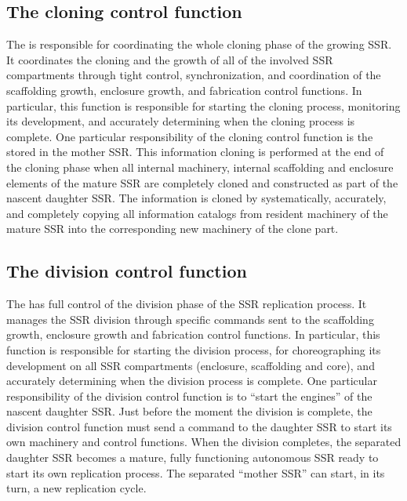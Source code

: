 \subsection{The cloning control function}

The  is responsible for coordinating the whole cloning phase of the
growing SSR. It coordinates the cloning and the
growth of all of the involved SSR compartments through tight control,
synchronization, and coordination of the scaffolding growth, enclosure
growth, and fabrication control functions. In particular, this function is responsible
for starting the cloning process, monitoring its development,
and accurately determining when the cloning process is complete. One
particular responsibility of the cloning control function is the
 stored in the mother SSR. This
information cloning is performed at the end of the cloning phase when
all internal machinery, internal scaffolding and enclosure elements of
the mature SSR are completely cloned and constructed as part of the
nascent daughter SSR. The information is cloned by systematically,
accurately, and completely copying all information catalogs from
resident machinery of the mature SSR into the corresponding new
machinery of the clone part.

\subsection{The division control function}

The  has full control of the division phase of the SSR replication
process. It manages the SSR division through specific commands sent to
the scaffolding growth, enclosure growth and fabrication control
functions.  In particular, this function is responsible for starting the
division process, for choreographing its development on all SSR
compartments (enclosure, scaffolding and core), and accurately
determining when the division process is complete. One particular
responsibility of the division control function is to “start the
engines” of the nascent daughter SSR. Just before the moment the
division is complete, the division control function must send a command
to the daughter SSR to start its own machinery and control functions.
When the division completes, the separated daughter SSR
becomes a mature, fully functioning autonomous SSR ready to start its
own replication process. The separated “mother SSR” can start, in its
turn, a new replication cycle.

